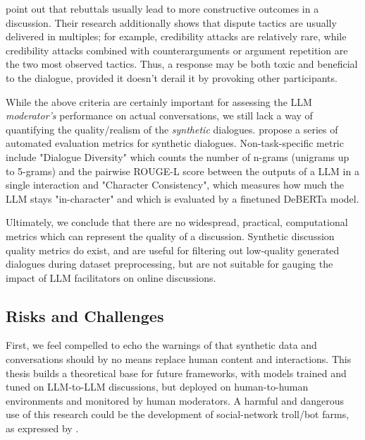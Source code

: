 \citet{dekock2022disagree} point out that rebuttals usually lead to more constructive outcomes in a discussion. Their research additionally shows that dispute tactics are usually delivered in multiples; for example, credibility attacks are relatively rare, while credibility attacks combined with counterarguments or argument repetition are the two most observed tactics. Thus, a response may be both toxic and beneficial to the dialogue, provided it doesn't derail it by provoking other participants.

While the above criteria are certainly important for assessing the LLM \textit{moderator's} performance on actual conversations, we still lack a way of quantifying the quality/realism of the \textit{synthetic} dialogues. \citet{ulmer2024bootstrappingllmbasedtaskorienteddialogue} propose a series of automated evaluation metrics for synthetic dialogues. Non-task-specific metric include "Dialogue Diversity" which counts the number of n-grams (unigrams up to 5-grams) and the pairwise ROUGE-L \cite{lin-2004-rouge} score between the outputs of a LLM in a single interaction and "Character Consistency", which measures how much the LLM stays "in-character" and which is evaluated by a finetuned DeBERTa \cite{he2023debertav3improvingdebertausing} model. 

Ultimately, we conclude that there are no widespread, practical, computational metrics which can represent the quality of a discussion. Synthetic discussion quality metrics do exist, and are useful for filtering out low-quality generated dialogues during dataset preprocessing, but are not suitable for gauging the impact of LLM facilitators on online discussions.


\subsection{Risks and Challenges}
\label{sec:related:challenges}

First, we feel compelled to echo the warnings of \citet{small-polis-llm} that synthetic data and conversations should by no means replace human content and interactions. This thesis builds a theoretical base for future frameworks, with models trained and tuned on LLM-to-LLM discussions, but deployed on human-to-human environments and monitored by human moderators. A harmful and dangerous use of this research could be the development of social-network troll/bot farms, as expressed by \citet{park2022socialsimulacracreatingpopulated}.

